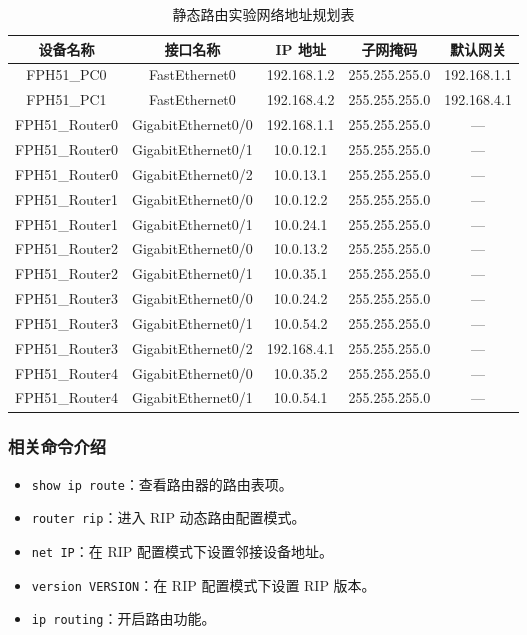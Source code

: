 \documentclass[UTF8,12pt,a4paper]{ctexart}
\begin{document}
\begin{table}[H]
\centering
\caption{静态路由实验网络地址规划表}
\begin{tabular}{ccccc}
\hline
设备名称 & 接口名称 & IP 地址 & 子网掩码 & 默认网关 \\
\hline
FPH51\_PC0 & FastEthernet0 & 192.168.1.2 & 255.255.255.0 & 192.168.1.1 \\
FPH51\_PC1 & FastEthernet0 & 192.168.4.2 & 255.255.255.0 & 192.168.4.1 \\
FPH51\_Router0 & GigabitEthernet0/0 & 192.168.1.1 & 255.255.255.0 & — \\
FPH51\_Router0 & GigabitEthernet0/1 & 10.0.12.1 & 255.255.255.0 & — \\
FPH51\_Router0 & GigabitEthernet0/2 & 10.0.13.1 & 255.255.255.0 & — \\
FPH51\_Router1 & GigabitEthernet0/0 & 10.0.12.2 & 255.255.255.0 & — \\
FPH51\_Router1 & GigabitEthernet0/1 & 10.0.24.1 & 255.255.255.0 & — \\
FPH51\_Router2 & GigabitEthernet0/0 & 10.0.13.2 & 255.255.255.0 & — \\
FPH51\_Router2 & GigabitEthernet0/1 & 10.0.35.1 & 255.255.255.0 & — \\
FPH51\_Router3 & GigabitEthernet0/0 & 10.0.24.2 & 255.255.255.0 & — \\
FPH51\_Router3 & GigabitEthernet0/1 & 10.0.54.2 & 255.255.255.0 & — \\
FPH51\_Router3 & GigabitEthernet0/2 & 192.168.4.1 & 255.255.255.0 & — \\
FPH51\_Router4 & GigabitEthernet0/0 & 10.0.35.2 & 255.255.255.0 & — \\
FPH51\_Router4 & GigabitEthernet0/1 & 10.0.54.1 & 255.255.255.0 & — \\
\hline
\end{tabular}
\end{table}

\subsubsection*{相关命令介绍}

\begin{itemize}
  \item \texttt{show ip route}：查看路由器的路由表项。
  \item \texttt{router rip}：进入 RIP 动态路由配置模式。
  \item \texttt{net IP}：在 RIP 配置模式下设置邻接设备地址。
  \item \texttt{version VERSION}：在 RIP 配置模式下设置 RIP 版本。
  \item \texttt{ip routing}：开启路由功能。
\end{itemize}
\end{document}
